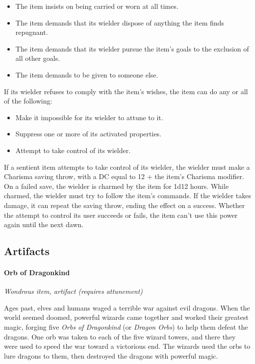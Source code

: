 \documentclass[
]{article}
\providecommand{\tightlist}{%
  \setlength{\itemsep}{0pt}\setlength{\parskip}{0pt}}
\begin{document}
\begin{itemize}
\tightlist
\item
  The item insists on being carried or worn at all times.
\item
  The item demands that its wielder dispose of anything the item finds
  repugnant.
\item
  The item demands that its wielder pursue the item's goals to the
  exclusion of all other goals.
\item
  The item demands to be given to someone else.
\end{itemize}

If its wielder refuses to comply with the item's wishes, the item can do
any or all of the following:

\begin{itemize}
\tightlist
\item
  Make it impossible for its wielder to attune to it.
\item
  Suppress one or more of its activated properties.
\item
  Attempt to take control of its wielder.
\end{itemize}

If a sentient item attempts to take control of its wielder, the wielder
must make a Charisma saving throw, with a DC equal to 12 + the item's
Charisma modifier. On a failed save, the wielder is charmed by the item
for 1d12 hours. While charmed, the wielder must try to follow the item's
commands. If the wielder takes damage, it can repeat the saving throw,
ending the effect on a success. Whether the attempt to control its user
succeeds or fails, the item can't use this power again until the next
dawn.

\hypertarget{artifacts}{%
\subsection{Artifacts}\label{artifacts}}

\hypertarget{orb-of-dragonkind}{%
\paragraph{Orb of Dragonkind}\label{orb-of-dragonkind}}

\emph{Wondrous item, artifact (requires attunement)}

Ages past, elves and humans waged a terrible war against evil dragons.
When the world seemed doomed, powerful wizards came together and worked
their greatest magic, forging five \emph{Orbs of Dragonkind} (or
\emph{Dragon Orbs}) to help them defeat the dragons. One orb was taken
to each of the five wizard towers, and there they were used to speed the
war toward a victorious end. The wizards used the orbs to lure dragons
to them, then destroyed the dragons with powerful magic.
\end{document}
